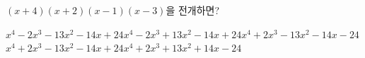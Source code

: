 $(x+4)(x+2)(x-1)(x-3)$을 전개하면?
\begin{choicesv}{$x^4-2x^3-13x^2-14x+24$}{$x^4-2x^3+13x^2-14x+24$}{$x^4+2x^3-13x^2-14x-24$}{$x^4+2x^3-13x^2-14x+24$}{$x^4+2x^3+13x^2+14x-24$}\end{choicesv}
